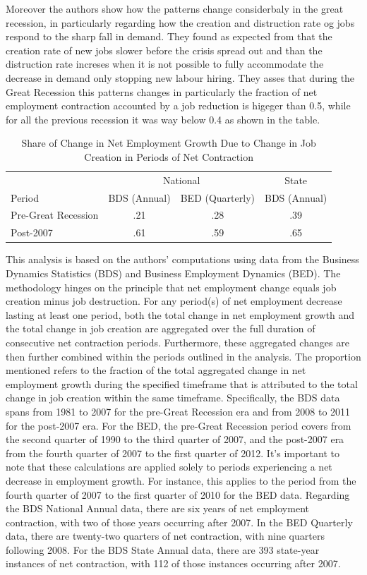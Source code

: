\documentclass[12pt]{article}
\begin{document}
Moreover the authors show how the patterns change considerbaly in the great recession, in particularly regarding how the
creation and distruction rate og jobs respond to the sharp fall in demand. They found as expected from \cite{CabHarm94}
that the creation rate of new jobs slower before the crisis spread out and than the distruction rate increses when it is
not possible to fully accommodate the decrease in demand only stopping new labour hiring. They asses that during the
Great Recession this patterns changes in particularly the fraction of net employment  contraction accounted by a job
reduction is higeger than 0.5, while for all the previous recession it was way below 0.4 as shown in the table.
\begin{table}[ht]
    \centering
    \caption{
    Share of Change in Net Employment Growth Due to Change in Job Creation in Periods of Net Contraction}

    \begin{tabular}{lccc}
    \hline & \multicolumn{2}{c}{ National } & State \\
    \cline { 2 - 3 } Period & BDS (Annual) & BED (Quarterly) & BDS (Annual) \\
    \hline Pre-Great Recession & .21 & .28 & .39 \\
    Post-2007 & .61 & .59 & .65 \\
    \hline
    \end{tabular}
    \label{tab:1.2}
\end{table}

This analysis is based on the authors' computations using data from the Business Dynamics Statistics (BDS) and Business
Employment Dynamics (BED). The methodology hinges on the principle that net employment change equals job creation minus
job destruction. For any period(s) of net employment decrease lasting at least one period, both the total change in net
employment growth and the total change in job creation are aggregated over the full duration of consecutive net
contraction periods. Furthermore, these aggregated changes are then further combined within the periods outlined in the
analysis. The proportion mentioned refers to the fraction of the total aggregated change in net employment growth during
the specified timeframe that is attributed to the total change in job creation within the same timeframe. Specifically,
the BDS data spans from 1981 to 2007 for the pre-Great Recession era and from 2008 to 2011 for the post-2007 era. For
the BED, the pre-Great Recession period covers from the second quarter of 1990 to the third quarter of 2007, and the
post-2007 era from the fourth quarter of 2007 to the first quarter of 2012. It's important to note that these
calculations are applied solely to periods experiencing a net decrease in employment growth. For instance, this applies
to the period from the fourth quarter of 2007 to the first quarter of 2010 for the BED data. Regarding the BDS National
Annual data, there are six years of net employment contraction, with two of those years occurring after 2007. In the BED
Quarterly data, there are twenty-two quarters of net contraction, with nine quarters following 2008. For the BDS State
Annual data, there are 393 state-year instances of net contraction, with 112 of those instances occurring after 2007. 
\end{document}

